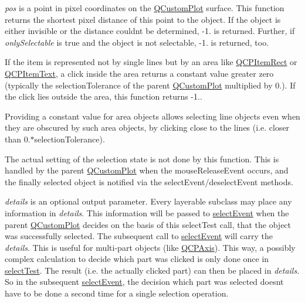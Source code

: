 {\itshape pos} is a point in pixel coordinates on the \hyperlink{class_q_custom_plot}{Q\+Custom\+Plot} surface. This function returns the shortest pixel distance of this point to the object. If the object is either invisible or the distance couldn\textquotesingle{}t be determined, -\/1. is returned. Further, if {\itshape only\+Selectable} is true and the object is not selectable, -\/1. is returned, too.

If the item is represented not by single lines but by an area like \hyperlink{class_q_c_p_item_rect}{Q\+C\+P\+Item\+Rect} or \hyperlink{class_q_c_p_item_text}{Q\+C\+P\+Item\+Text}, a click inside the area returns a constant value greater zero (typically the selection\+Tolerance of the parent \hyperlink{class_q_custom_plot}{Q\+Custom\+Plot} multiplied by 0.). If the click lies outside the area, this function returns -\/1..

Providing a constant value for area objects allows selecting line objects even when they are obscured by such area objects, by clicking close to the lines (i.\+e. closer than 0.$\ast$selection\+Tolerance).

The actual setting of the selection state is not done by this function. This is handled by the parent \hyperlink{class_q_custom_plot}{Q\+Custom\+Plot} when the mouse\+Release\+Event occurs, and the finally selected object is notified via the select\+Event/deselect\+Event methods.

{\itshape details} is an optional output parameter. Every layerable subclass may place any information in {\itshape details}. This information will be passed to \hyperlink{class_q_c_p_abstract_item_aaf92af7b9893712959a6c073d334d88d}{select\+Event} when the parent \hyperlink{class_q_custom_plot}{Q\+Custom\+Plot} decides on the basis of this select\+Test call, that the object was successfully selected. The subsequent call to \hyperlink{class_q_c_p_abstract_item_aaf92af7b9893712959a6c073d334d88d}{select\+Event} will carry the {\itshape details}. This is useful for multi-\/part objects (like \hyperlink{class_q_c_p_axis}{Q\+C\+P\+Axis}). This way, a possibly complex calculation to decide which part was clicked is only done once in \hyperlink{class_q_c_p_item_curve_a741375c11667b5f9c95b2683f93ee514}{select\+Test}. The result (i.\+e. the actually clicked part) can then be placed in {\itshape details}. So in the subsequent \hyperlink{class_q_c_p_abstract_item_aaf92af7b9893712959a6c073d334d88d}{select\+Event}, the decision which part was selected doesn\textquotesingle{}t have to be done a second time for a single selection operation.


